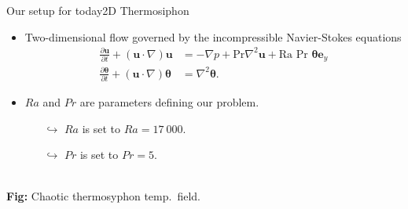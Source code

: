\begin{frame}[t, c]{Our setup for today}{2D Thermosiphon}
  \begin{minipage}{.58\textwidth}
    \begin{itemize}
      \item Two-dimensional flow governed by the incompressible Navier-Stokes equations
      \[
      \begin{aligned}
        \frac{\partial \bm{u}}{\partial t} + (\bm{u} \cdot \nabla ) \bm{u} & = -\nabla p + \textrm{Pr} \nabla^2 \bm{u} + \textrm{Ra Pr } \boldsymbol{\theta} \bm{e}_y \\
        \frac{\partial \boldsymbol{\theta}}{\partial t} + \left( \bm{u} \cdot \nabla \right) \boldsymbol{\theta} & = \nabla^2 \boldsymbol{\theta}.
      \end{aligned}
      \]

      \item \(  Ra  \) and \( Pr  \) are parameters defining our problem.
      \begin{itemize}
        \item[\(  \hookrightarrow \)] \(  Ra  \)   is set to \( Ra = 17\ 000  \).
        \item[\(  \hookrightarrow \)] \(  Pr  \) is set to \( Pr = 5 \).
      \end{itemize}
    \end{itemize}
  \end{minipage}%
  \hfill
  \begin{minipage}{.38\textwidth}
    \centering
     \\
    {\small
    \textbf{Fig:} Chaotic thermosyphon temp.\ field.
    }
  \end{minipage}

  \vspace{1cm}
\end{frame}

%

